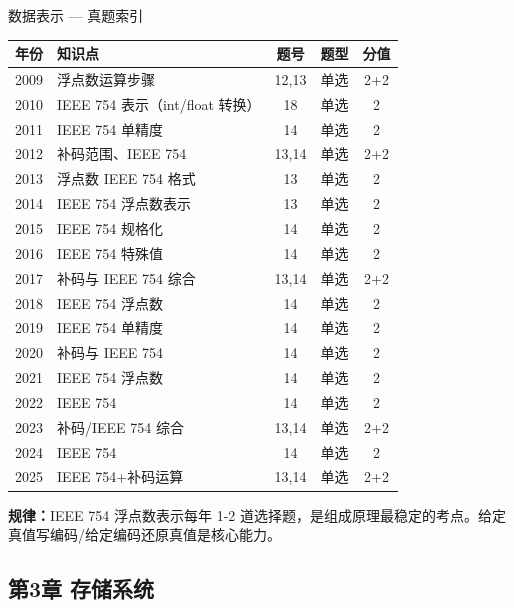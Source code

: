 \begin{tablebox}{数据表示 — 真题索引}
\centering
\begin{tabular}{|c|l|c|c|c|}
\hline
年份 & 知识点 & 题号 & 题型 & 分值 \\
\hline
2009 & 浮点数运算步骤 & 12,13 & 单选 & 2+2 \\
2010 & IEEE 754 表示（int/float 转换）& 18 & 单选 & 2 \\
2011 & IEEE 754 单精度 & 14 & 单选 & 2 \\
2012 & 补码范围、IEEE 754 & 13,14 & 单选 & 2+2 \\
2013 & 浮点数 IEEE 754 格式 & 13 & 单选 & 2 \\
2014 & IEEE 754 浮点数表示 & 13 & 单选 & 2 \\
2015 & IEEE 754 规格化 & 14 & 单选 & 2 \\
2016 & IEEE 754 特殊值 & 14 & 单选 & 2 \\
2017 & 补码与 IEEE 754 综合 & 13,14 & 单选 & 2+2 \\
2018 & IEEE 754 浮点数 & 14 & 单选 & 2 \\
2019 & IEEE 754 单精度 & 14 & 单选 & 2 \\
2020 & 补码与 IEEE 754 & 14 & 单选 & 2 \\
2021 & IEEE 754 浮点数 & 14 & 单选 & 2 \\
2022 & IEEE 754 & 14 & 单选 & 2 \\
2023 & 补码/IEEE 754 综合 & 13,14 & 单选 & 2+2 \\
2024 & IEEE 754 & 14 & 单选 & 2 \\
2025 & IEEE 754+补码运算 & 13,14 & 单选 & 2+2 \\
\hline
\end{tabular}
\end{tablebox}

\noindent\textbf{规律：}IEEE 754 浮点数表示每年 1-2 道选择题，是组成原理最稳定的考点。给定真值写编码/给定编码还原真值是核心能力。

\subsection*{第3章 存储系统}

